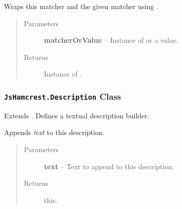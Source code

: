 \documentclass[letterpaper,10pt,english]{sphinxmanual}
\begin{document}

\begin{fulllineitems}
\label{modules/jshamcrest:JsHamcrest.CombinableMatcher.or}
Wraps this matcher and the given matcher using {\hyperref[modules/matchers:JsHamcrest.Matchers.anyOf]{}}.
\begin{quote}\begin{description}
\item[{Parameters}] \leavevmode
\textbf{matcherOrValue} -- Instance of {\hyperref[modules/jshamcrest:JsHamcrest.SimpleMatcher]{}} or a
value.

\item[{Returns}] \leavevmode
Instance of {\hyperref[modules/jshamcrest:JsHamcrest.CombinableMatcher]{}}.

\end{description}\end{quote}

\end{fulllineitems}



\subsubsection{\texttt{JsHamcrest.Description} Class}
\label{modules/jshamcrest:jshamcrest-description-class}

\begin{fulllineitems}
\label{modules/jshamcrest:JsHamcrest.Description}
Extends . Defines a textual description builder.

\end{fulllineitems}


\begin{fulllineitems}
\label{modules/jshamcrest:JsHamcrest.Description.append}
Appends \emph{text} to this description.
\begin{quote}\begin{description}
\item[{Parameters}] \leavevmode
\textbf{text} -- Text to append to this description.

\item[{Returns}] \leavevmode
this.

\end{description}\end{quote}

\end{fulllineitems}
\end{document}
